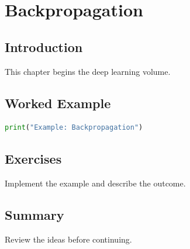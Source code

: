 \chapter{Backpropagation}
\label{chap:vol7-5}



\section{Introduction}
This chapter begins the deep learning volume.

\section{Worked Example}
\begin{lstlisting}[language=Python]
print("Example: Backpropagation")
\end{lstlisting}

\section{Exercises}
\begin{exercise}
Implement the example and describe the outcome.
\end{exercise}

\section{Summary}
Review the ideas before continuing.

